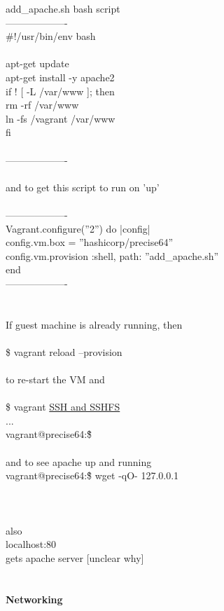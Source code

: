 \documentclass[10pt,a4paper]{article}
\begin{document}
{{{{{{{{{{{{{{{{{{{{{{{{add\_apache.sh   bash script\\
-------------------\\
\#!/usr/bin/env bash\\
\\
apt-get update\\
apt-get install -y apache2\\
if ! [ -L /var/www ]; then\\
  rm -rf /var/www\\
  ln -fs /vagrant /var/www\\
fi\\
\\
-------------------\\
\\
and to get this script to run on 'up'\\
\\
-------------------\\
Vagrant.configure(''2'') do |config|\\
  config.vm.box = ''hashicorp/precise64''\\
  config.vm.provision :shell, path: ''add\_apache.sh''\\
end\\
-------------------\\
\\
\\
If guest machine is already running, then\\
\\
\$ vagrant reload --provision\\
\\
to re-start the VM and\\
\\
\$ vagrant \hyperlink{ssh___and_sshfs}{SSH   and SSHFS}\\
...\\
vagrant@precise64:\~\$\\
\\
and to see apache up and running\\
vagrant@precise64:\~\$ wget -qO- 127.0.0.1\\
\\
[- q quiet  -O  Output file ]\\
\\
also\\
localhost:80\\
gets apache server [unclear why]\\
\\
\\
\textbf{Networking}\\
}}}}}}}}}}}}}}}}}}}}}}}}
\end{document}
